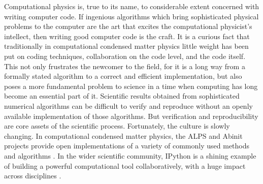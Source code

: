 Computational physics is, true to its name, to considerable extent concerned
with writing computer code. If ingenious algorithms which bring sophisticated
physical problems to the computer are the art that excites the computational
physicist's intellect, then writing good computer code is the craft. It is a
curious fact that traditionally in computational condensed matter physics little
weight has been put on coding techniques, collaboration on the code level, and
the code itself. This not only frustrates the newcomer to the field, for it is a
long way from a formally stated algorithm to a correct and efficient
implementation, but also poses a more fundamental problem to science in a time
when computing has long become an essential part of it. Scientific results
obtained from sophisticated numerical algorithms can be difficult to verify and
reproduce without an openly available implementation of those algorithms. But
verification and reproducibility are core assets of the scientific process.
Fortunately, the culture is slowly changing. In computational condensed matter
physics, the ALPS and Abinit projects provide open implementations of a variety
of commonly used methods and algorithms \cite{bauer2011alps}
\cite{gonze2009abinit}. In the wider scientific community, IPython is a shining
example of building a powerful computational tool collaboratively, with a huge
impact across disciplines \cite{perez2007ipython}.

